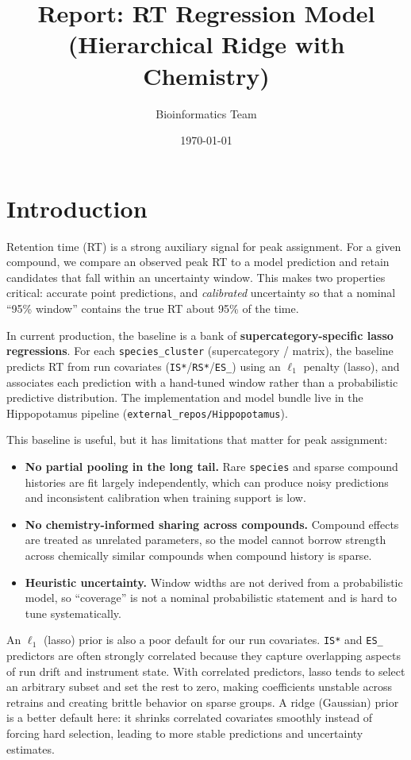 \documentclass[11pt]{article}
\title{Report: RT Regression Model (Hierarchical Ridge with Chemistry)}
\author{Bioinformatics Team}
\date{\today}
\begin{document}
\maketitle

\section{Introduction}

Retention time (RT) is a strong auxiliary signal for peak assignment. For a given compound, we compare an observed peak
RT to a model prediction and retain candidates that fall within an uncertainty window. This makes two properties
critical: accurate point predictions, and \emph{calibrated} uncertainty so that a nominal ``95\% window'' contains the
true RT about 95\% of the time.

In current production, the baseline is a bank of \textbf{supercategory-specific lasso regressions}. For each
\nolinkurl{species\_cluster} (supercategory / matrix), the baseline predicts RT from run covariates
(\texttt{IS*}/\texttt{RS*}/\texttt{ES\_\*}) using an $\ell_1$ penalty (lasso), and associates each prediction with a
hand-tuned window rather than a probabilistic predictive distribution. The implementation and model bundle live in the
Hippopotamus pipeline (\nolinkurl{external_repos/Hippopotamus}).

This baseline is useful, but it has limitations that matter for peak assignment:
\begin{itemize}
  \item \textbf{No partial pooling in the long tail.} Rare \nolinkurl{species} and sparse compound histories are fit
  largely independently, which can produce noisy predictions and inconsistent calibration when training support is low.
  \item \textbf{No chemistry-informed sharing across compounds.} Compound effects are treated as unrelated parameters,
  so the model cannot borrow strength across chemically similar compounds when compound history is sparse.
  \item \textbf{Heuristic uncertainty.} Window widths are not derived from a probabilistic model, so ``coverage'' is not
  a nominal probabilistic statement and is hard to tune systematically.
\end{itemize}

An $\ell_1$ (lasso) prior is also a poor default for our run covariates. \texttt{IS*} and \texttt{ES\_\*} predictors are
often strongly correlated because they capture overlapping aspects of run drift and instrument state. With correlated
predictors, lasso tends to select an arbitrary subset and set the rest to zero, making coefficients unstable across
retrains and creating brittle behavior on sparse groups. A ridge (Gaussian) prior is a better default here: it shrinks
correlated covariates smoothly instead of forcing hard selection, leading to more stable predictions and uncertainty
estimates.
\end{document}
